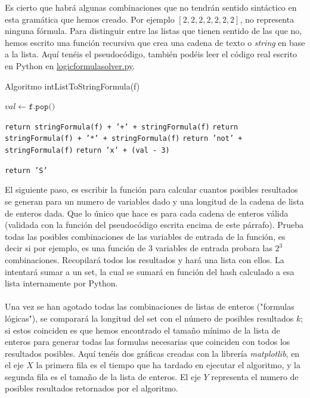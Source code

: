 Es cierto que habrá algunas combinaciones que no tendrán sentido sintáctico en esta gramática que hemos creado. Por ejemplo $[2, 2, 2, 2, 2, 2, 2]$, no representa ninguna fórmula. Para distinguir entre las listas que tienen sentido de las que no, hemos escrito una función recursiva que crea una cadena de texto o \textit{string} en base a la lista. Aquí tenéis el pseudocódigo, también podéis leer el código real escrito en Python en \href{https://github.com/domingoUnican/TFGPedroCastro/blob/main/code/logicformula_solver/logicform_solver.py}{logicformulasolver.py}.
\begin{algorithm}
\caption{Algoritmo intListToStringFormula(f)}\label{alg:five}
 {
    $val \gets \texttt{f.pop()}$
    
     {
        \texttt{return stringFormula(f) + '+' + stringFormula(f)}\;
    }
     {
        \texttt{return stringFormula(f) + '*' + stringFormula(f)}\;
    }
     {
        \texttt{return 'not' + stringFormula(f)}\;
    }
    \texttt{return 'x' + (val - 3)}\;
}
\texttt{return 'S'}\;
\end{algorithm}

\noindent El siguiente paso, es escribir la función para calcular cuantos posibles resultados se generan para un numero de variables dado y una longitud de la cadena de lista de enteros dada. Que lo único que hace es para cada cadena de enteros válida (validada con la función del pseudocódigo escrita encima de este párrafo). Prueba todas las posibles combinaciones de las variables de entrada de la función, es decir si por ejemplo, es una función de 3 variables de entrada probara las $2^3$ combinaciones. Recopilará todos los resultados y hará una lista con ellos. La intentará sumar a un set, la cual se sumará en función del hash calculado a esa lista internamente por Python.\\\\ Una vez se han agotado todas las combinaciones de listas de enteros ("formulas lógicas"), se comparará la longitud del set con el número de posibles resultados $k$; si estos coinciden es que hemos encontrado el tamaño mínimo de la lista de enteros para generar todas las formulas necesarias que coinciden con todos los resultados posibles. 
\newpage
\noindent Aquí tenéis dos gráficas creadas con la librería \textit{matplotlib}, en el eje $X$ la primera fila es el tiempo que ha tardado en ejecutar el algoritmo, y la segunda fila es el tamaño de la lista de enteros. El eje $Y$ representa el numero de posibles resultados retornados por el algoritmo.

